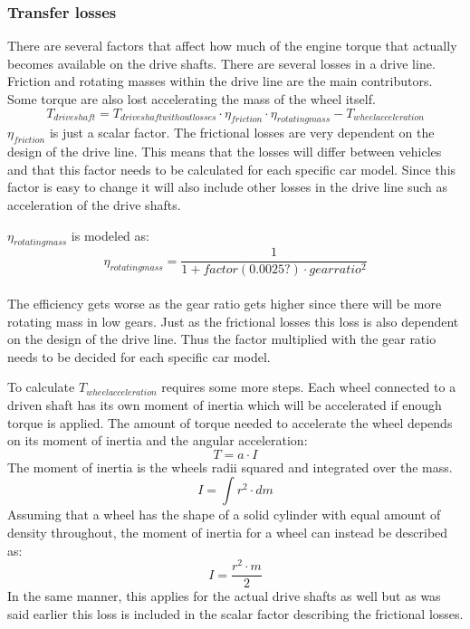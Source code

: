 \subsubsection{Transfer losses}
There are several factors that affect how much of the engine torque that actually becomes available on the drive shafts. There are several losses in a drive line. Friction and rotating masses within the drive line are the main contributors. Some torque are also lost accelerating the mass of the wheel itself.
\begin{equation}
T_{driveshaft} = T_{driveshaftwithoutlosses}\cdot\eta_{friction}\cdot\eta_{rotating mass} - T_{wheelacceleration}
\end{equation}
$ \eta_{friction} $ is just a scalar factor. The frictional losses are very dependent on the design of the drive line. This means that the losses will differ between vehicles and that this factor needs to be calculated for each specific car model. Since this factor is easy to change it will also include other losses in the drive line such as acceleration of the drive shafts. 

$ \eta_{rotating mass} $ is modeled as:
\begin{equation}
\eta_{rotating mass} = \frac{1}{1 + factor(0.0025?)\cdot gearratio^2}
\end{equation}\\
The efficiency gets worse as the gear ratio gets higher since there will be more rotating mass in low gears.  Just as the frictional losses this loss is also dependent on the design of the drive line. Thus the factor multiplied with the gear ratio needs to be decided for each specific car model.

To calculate $ T_{wheelacceleration} $ requires some more steps. Each wheel connected to a driven shaft has its own moment of inertia which will be accelerated if enough torque is applied. The amount of torque needed to accelerate the wheel depends on its moment of inertia and the angular acceleration:
\begin{equation}
	T = a \cdot I
\end{equation}
The moment of inertia is the wheels radii squared and integrated over the mass. 
\begin{equation}
	I = \int r^2 \cdot dm
\end{equation}
Assuming that a wheel has the shape of a solid cylinder with equal amount of density throughout, the moment of inertia for a wheel can instead be described as:
\begin{equation}
	I = \dfrac{r^2 \cdot m}{2} 
\end{equation}
In the same manner, this applies for the actual drive shafts as well but as was said earlier this loss is included in the scalar factor describing the frictional losses. 

